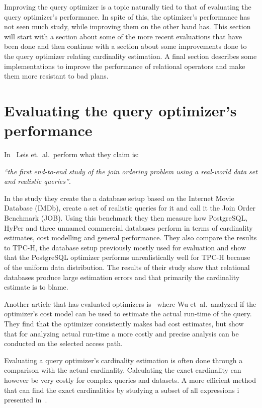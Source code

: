 Improving the query optimizer is a topic naturally tied to that of evaluating
the query optimizer's performance. In spite of this, the optimizer's performance
has not seen much study, while improving them on the other hand has. This
section will start with a section about some of the more recent evaluations that
have been done and then continue with a section about some improvements done to
the query optimizer relating cardinality estimation. A final section describes
some implementations to improve the performance of relational operators and make
them more resistant to bad plans.

\section{Evaluating the query optimizer's performance}
In~\cite{leis_2015_how_hgaqor} Leis et.\ al.\ perform what they claim is:

\textit{``the first end-to-end study of the join ordering problem using a
  real-world data set and realistic queries''}.

In the study they create the a database setup based on the Internet Movie
Database (IMDb), create a set of realistic queries for it and call it the Join
Order Benchmark (JOB). Using this benchmark they then measure how PostgreSQL,
HyPer and three unnamed commercial databases perform in terms of cardinality
estimates, cost modelling and general performance. They also compare the results
to TPC-H, the database setup previously mostly used for evaluation and show that
the PostgreSQL optimizer performs unrealistically well for TPC-H because of the
uniform data distribution. The results of their study show that relational
databases produce large estimation errors and that primarily the cardinality
estimate is to blame.

Another article that has evaluated optimizers
is~\cite{wu_2013_predicting_pqetaocmru} where Wu  et\ al.\ analyzed if the
optimizer's cost model can be used to estimate the actual run-time of the query.
They find that the optimizer consistently makes bad cost estimates, but show
that for analyzing actual run-time a more costly and precise analysis can be
conducted on the selected access path.

Evaluating a query optimizer's cardinality estimation is often done through a
comparison with the actual cardinality. Calculating the exact cardinality can
however be very costly for complex queries and datasets. A more efficient method
that can find the exact cardinalities by studying a subset of all expressions i
presented in~\cite{chaudhuri_2009_exact_ecqofot}.

